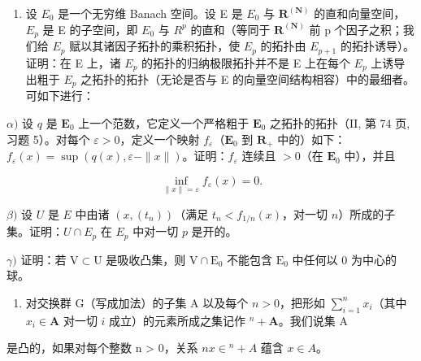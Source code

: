 \begin{enumerate}
\def\labelenumi{\alph{enumi})}
\setcounter{enumi}{1}
\tightlist
\item
  设 \(E_{0}\) 是一个无穷维 Banach 空间。设 E 是 \(E_{0}\) 与 \(\mathbf{R}^{(\mathbf{N})}\) 的直和向量空间，\(E_{p}\) 是 E 的子空间，即 \(E_{0}\) 与 \(R^{p}\) 的直和（等同于 \(\mathbf{R}^{(\mathbf{N})}\) 前 p 个因子之积；我们给 \(E_{p}\) 赋以其诸因子拓扑的乘积拓扑，使 \(E_{p}\) 的拓扑由 \(E_{p+1}\) 的拓扑诱导）。证明：在 E 上，诸 \(E_{p}\) 的拓扑的归纳极限拓扑并不是 E 上在每个 \(E_{p}\) 上诱导出粗于 \(E_{p}\) 之拓扑的拓扑（无论是否与 E 的向量空间结构相容）中的最细者。可如下进行：
\end{enumerate}

\(\alpha)\) 设 \(q\) 是 \(\mathbf{E}_0\) 上一个范数，它定义一个严格粗于 \(\mathbf{E}_0\) 之拓扑的拓扑（II, 第 74 页, 习题 5）。对每个 \(\varepsilon > 0\)，定义一个映射 \(f_{\varepsilon}\)（\(\mathbf{E}_0\) 到 \(\mathbf{R}_+\) 中的）如下：\(f_{\varepsilon}(x) = \sup(q(x), \varepsilon - \| x \|)\)。证明：\(f_{\varepsilon}\) 连续且 \(>0\)（在 \(\mathbf{E}_0\) 中），并且

\[
\inf_{\| x \| = \varepsilon} f_{\varepsilon}(x) = 0 .
\]

\(\beta)\) 设 \(U\) 是 \(E\) 中由诸 \((x, (t_n))\)（满足 \(t_n < f_{1/n}(x)\)，对一切 \(n\)）所成的子集。证明：\(U \cap E_p\) 在 \(E_p\) 中对一切 \(p\) 是开的。

\(\gamma)\) 证明：若 \(\mathrm{V} \subset \mathrm{U}\) 是吸收凸集，则 \(\mathrm{V} \cap \mathrm{E}_0\) 不能包含 \(\mathrm{E}_0\) 中任何以 0 为中心的球。

\begin{enumerate}
\def\labelenumi{\arabic{enumi})}
\setcounter{enumi}{16}
\tightlist
\item
  对交换群 G（写成加法）的子集 A 以及每个 \(n > 0\)，把形如 \(\sum_{i=1}^{n} x_i\)（其中 \(x_i \in \mathbf{A}\) 对一切 \(i\) 成立）的元素所成之集记作 \({}^{n}+\mathbf{A}\)。我们说集 A
\end{enumerate}

是凸的，如果对每个整数 n > 0，关系 \(nx \in {}^{n}+A\) 蕴含 \(x \in A\)。

